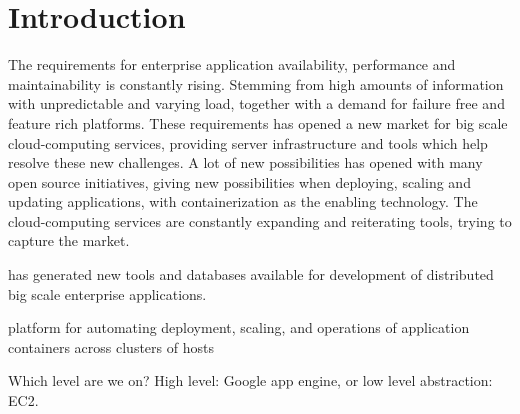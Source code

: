 \chapter{Introduction}
\label{ch:introduction}
The requirements for enterprise application availability, performance and maintainability is constantly rising. Stemming from high amounts of information with unpredictable and varying load, together with a demand for failure free and feature rich platforms. These requirements has opened a new market for big scale cloud-computing services, providing server infrastructure and tools which help resolve these new challenges. A lot of new possibilities has opened with many open source initiatives, giving new possibilities when deploying, scaling and updating applications, with containerization as the enabling technology. The cloud-computing services are constantly expanding and reiterating tools, trying to capture the market.




has generated new tools and databases available for development of distributed big scale enterprise applications.

platform for automating deployment, scaling, and operations of application containers across clusters of hosts


Which level are we on? High level: Google app engine, or low level abstraction: EC2.